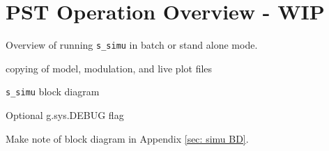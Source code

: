 \chapter{PST Operation Overview - WIP}

Overview of running \verb|s_simu| in batch or stand alone mode.

copying of model, modulation, and live plot files

\verb|s_simu| block diagram

Optional g.sys.DEBUG flag

Make note of block diagram in Appendix \ref{sec: simu BD}.